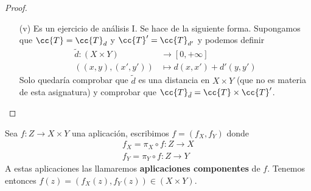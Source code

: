 \begin{prop}
\begin{proof}
\begin{itemize}
\begin{itemize}
                \item[(v)] Es un ejercicio de análisis I. Se hace de la siguiente forma. Supongamos que $\cc{T}=\cc{T}_d$ y $\cc{T}'=\cc{T}_{d'}$ y podemos definir
                \begin{align*}
                    \tilde{d} :(X\times Y) &\to [0,+\infty]\\
                    ((x,y),(x',y')) & \mapsto d(x,x') + d'(y,y')
                \end{align*}
                Solo quedaría comprobar que $\tilde{d}$ es una distancia en $X\times Y$ (que no es materia de esta asignatura) y comprobar que $\cc{T}_{\tilde{d}} = \cc{T}\times \cc{T}'$.
            \end{itemize}
        \end{itemize}
    \end{proof}
\end{prop}

\begin{definicion}
    Sea $f:Z \to X \times Y$ una aplicación, escribimos $f=(f_X, f_Y)$ donde
    \begin{align*}
        f_X=\pi_X \circ f: Z \to X\\
        f_Y=\pi_Y \circ f: Z \to Y
    \end{align*}
    A estas aplicaciones las llamaremos \textbf{aplicaciones componentes} de $f$. Tenemos entonces $f(z)=(f_X(z), f_Y(z))\in (X \times Y)$.
    \endsquare
\end{definicion}

